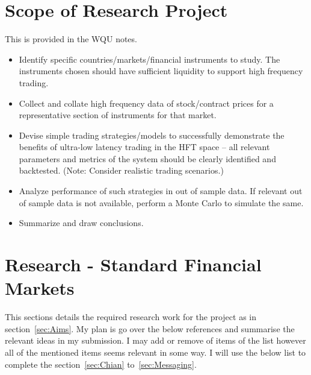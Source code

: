 \documentclass[12pt]{article}
\begin{document}
\section{Scope of Research Project}
\label{sec:Scope}
This is provided in the WQU notes.
\begin{itemize}
\item Identify specific countries/markets/financial instruments to study. The
instruments chosen should have sufficient liquidity to support high
frequency trading.
\item Collect and collate high frequency data of stock/contract prices for a
representative section of instruments for that market.
\item Devise simple trading strategies/models to successfully demonstrate the
benefits of ultra-low latency trading in the HFT space – all relevant
parameters and metrics of the system should be clearly identified and
backtested.
(Note: Consider realistic trading scenarios.)
\item Analyze performance of such strategies in out of sample data. If relevant
out of sample data is not available, perform a Monte Carlo to simulate the
same.
\item Summarize and draw conclusions.
\end{itemize}

\section{Research - Standard Financial Markets}
This sections details the required research work for the project as in section~\ref{sec:Aims}. My plan is go over the below references and summarise the relevant ideas in my submission. I may add or remove of items of the list however all of the mentioned items seems relevant in some way. I will use the below list to complete the section~\ref{sec:Chian} to~\ref{sec:Messaging}.
\end{document}

